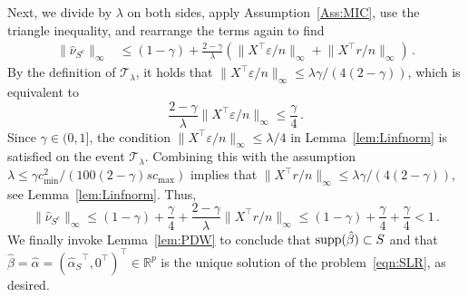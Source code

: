 \documentclass{elsarticle}
\def\T{\top}
\newcommand\norm[1]{\lVert#1\rVert}
\newcommand{\estipara}{{\hat{\beta}}}
\newcommand{\tuning}{{\lambda}}
\newcommand{\R}{{\mathbb{R}}}
\newcommand{\primal}{{\hat{\alpha}}}
\newcommand{\prims}{{\hat{\alpha}_{S}}}
\newcommand{\dualsc}{{\hat{\nu}_{{S}^c}}}
\newcommand{\redef}{=}
\begin{document}
   Next, we divide by $\tuning$ on both sides, apply Assumption~\ref{Ass:MIC}, use the triangle inequality, and rearrange the terms again to find
   \begin{equation*}
     \begin{aligned}
       \norm{\dualsc}_{\infty}&\leq(1-\gamma)+\frac{2-\gamma}{\tuning}(\norm{X^\T \varepsilon/n
       }_{\infty}+\norm{X^\T r/n}_{\infty})\,.
     \end{aligned}
   \end{equation*}
   By the definition of $\mathcal{T}_{\tuning}$, it holds that $\norm{X^\T\varepsilon/n}_{\infty}\leq \tuning \gamma/(4(2-\gamma))$, which is equivalent to
   \begin{equation*}
   \frac{2-\gamma}{\tuning}\norm{X^\T \varepsilon/n}_{\infty}\leq \frac{\gamma}{4}\,.
   \end{equation*}
   Since $\gamma\in(0,1]$, the condition $\norm{X^\T \varepsilon/n}_{\infty} \leq \tuning/4$ in Lemma~\ref{lem:Linfnorm} is satisfied on the event $\mathcal{T}_{\tuning}$. Combining this with the assumption $\tuning \leq \gamma c_{\min}^2/(100(2-\gamma)sc_{\max})$ implies that $\norm{X^\T r/n}_{\infty}\leq \tuning\gamma/(4(2-\gamma))$, see Lemma~\ref{lem:Linfnorm}. Thus,
   \begin{equation*}
     \norm{\dualsc}_{\infty}\leq(1-\gamma)+\frac{\gamma}{4}+\frac{2-\gamma}{\tuning}\norm{X^\T r/n}_{\infty}\leq(1-\gamma)+\frac{\gamma}{4}+\frac{\gamma}{4}<1\,.
   \end{equation*}
  We finally invoke Lemma~\ref{lem:PDW} to conclude that $\textnormal{supp}(\estipara)\subset S$ and that $\estipara = \primal\redef (\prims^\T,0^\T)^\T \in \R^p$ is the unique solution of the problem~\eqref{eqn:SLR}, as desired.
\end{document}
